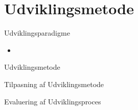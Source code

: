 \section*{Udviklingsmetode}

\begin{frame}{Udviklingsparadigme}

\begin{itemize}
	\item 
\end{itemize}

\end{frame}

\begin{frame}{Udviklingsmetode}



\end{frame}

\begin{frame}{Tilpasning af Udviklingsmetode}
	
\end{frame}

\begin{frame}{Evaluering af Udviklingsproces}
	
\end{frame}